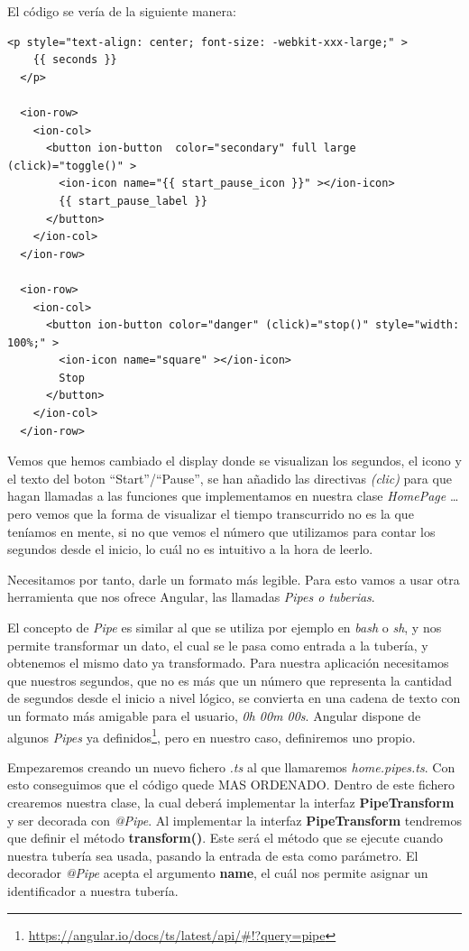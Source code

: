 El código se vería de la siguiente manera:

\begin{lstlisting}[style=htmlcssjs,frame=tlrb,xleftmargin={0.2cm}]
  <p style="text-align: center; font-size: -webkit-xxx-large;" >
    {{ seconds }}
  </p>

  <ion-row>
    <ion-col>
      <button ion-button  color="secondary" full large (click)="toggle()" >
        <ion-icon name="{{ start_pause_icon }}" ></ion-icon>
        {{ start_pause_label }}
      </button>
    </ion-col>
  </ion-row>

  <ion-row>
    <ion-col>
      <button ion-button color="danger" (click)="stop()" style="width: 100%;" >
        <ion-icon name="square" ></ion-icon>
        Stop
      </button>
    </ion-col>
  </ion-row>
\end{lstlisting}

Vemos que hemos cambiado el display donde se visualizan los segundos, el icono y el texto del boton ``Start''/``Pause'', se han añadido las directivas \emph{(clic)} para que hagan llamadas a las funciones que implementamos en nuestra clase \emph{HomePage} \ldots pero vemos que la forma de visualizar el tiempo transcurrido no es la que teníamos en mente, si no que vemos el número que utilizamos para contar los segundos desde el inicio, lo cuál no es intuitivo a la hora de leerlo.

Necesitamos por tanto, darle un formato más legible. Para esto vamos a usar otra herramienta que nos ofrece Angular, las llamadas \emph{Pipes o tuberias}.

El concepto de \emph{Pipe} es similar al que se utiliza por ejemplo en \emph{bash} o \emph{sh}, y nos permite transformar un dato, el cual se le pasa como entrada a la tubería, y obtenemos el mismo dato ya transformado. Para nuestra aplicación necesitamos que nuestros segundos, que no es más que un número que representa la cantidad de segundos desde el inicio a nivel lógico, se convierta en una cadena de texto con un formato más amigable para el usuario, \emph{0h 00m 00s}. Angular dispone de algunos \emph{Pipes} ya definidos\footnote{\url{https://angular.io/docs/ts/latest/api/#!?query=pipe}}, pero en nuestro caso, definiremos uno propio.

Empezaremos creando un nuevo fichero \emph{.ts} al que llamaremos \emph{home.pipes.ts}. Con esto conseguimos que el código quede MAS ORDENADO. Dentro de este fichero crearemos nuestra clase, la cual deberá implementar la interfaz \textbf{PipeTransform} y ser decorada con \emph{@Pipe}. Al implementar la interfaz \textbf{PipeTransform} tendremos que definir el método \textbf{transform()}. Este será el método que se ejecute cuando nuestra tubería sea usada, pasando la entrada de esta como parámetro. El decorador \emph{@Pipe} acepta el argumento \textbf{name}, el cuál nos permite asignar un identificador a nuestra tubería.

